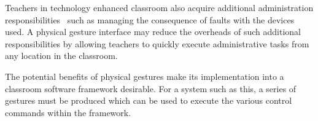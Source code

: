 \documentclass[manuscript, review, screen]{acmart}
\begin{document}
Teachers in technology enhanced classroom also acquire additional administration responsibilities~\citep{Kuhn2005} such as managing the consequence of faults with the devices used.
A physical gesture interface may reduce the overheads of such additional responsibilities by allowing teachers to quickly execute administrative tasks from any location in the classroom.

The potential benefits of physical gestures make its implementation into a classroom software framework desirable.
For a system such as this, a series of gestures must be produced which can be used to execute the various control commands within the framework.


\end{document}
